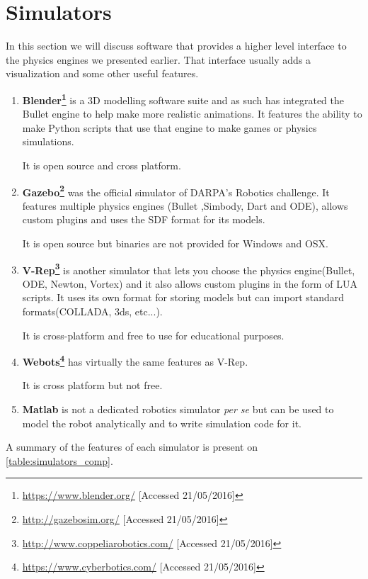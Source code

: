 \section{Simulators}
In this section we will discuss software that provides a higher level interface to the physics engines we presented earlier. That interface usually adds a visualization and some other useful features.
\begin{enumerate}

\item \textbf{Blender\footnote{\url{https://www.blender.org/} [Accessed 21/05/2016]}} is a 3D modelling software suite and as such has integrated the Bullet engine to help make more realistic animations. It features the ability to make Python scripts that use that engine to make games or physics simulations. 

It is open source and cross platform.

\item \textbf{Gazebo\footnote{\url{http://gazebosim.org/} [Accessed 21/05/2016]}} was the official simulator of DARPA's Robotics challenge. It features multiple physics engines (Bullet ,Simbody, Dart and ODE), allows custom plugins and uses the SDF format for its models. 

It is open source but binaries are not provided for Windows and OSX.

\item \textbf{V-Rep\footnote{\url{http://www.coppeliarobotics.com/} [Accessed 21/05/2016]}} is another simulator that lets you choose the physics engine(Bullet, ODE, Newton, Vortex) and it also allows custom plugins in the form of LUA scripts. It uses its own format for storing models but can import standard formats(COLLADA, 3ds, etc...).

It is cross-platform and free to use for educational purposes.

\item \textbf{Webots\footnote{\url{https://www.cyberbotics.com/} [Accessed 21/05/2016]}} has virtually the same features as V-Rep.

It is cross platform but not free.

\item \textbf{Matlab} is not a dedicated robotics simulator \textit{per se} but can be used to model the robot analytically and to write simulation code for it. 
\end{enumerate}

A summary of the features of each simulator is present on \cref{table:simulators_comp}.

